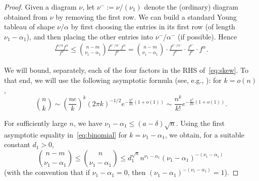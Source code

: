 \documentclass[12pt]%
{amsart}
\newcommand{\al}{{\alpha}}
\theoremstyle{plain}
\theoremstyle{definition}
\theoremstyle{remark}
\newcommand{\todo}[1]{\vspace{5 mm}\par \noindent
	\marginpar{\textsc{ToDo}} \framebox{\begin{minipage}[c]{0.95
				\textwidth}
			#1 \end{minipage}}\vspace{5 mm}\par}
\begin{document}
\begin{proof}
Given a diagram $\nu$, let $\nu^-:=\nu/(\nu_1)$ denote the (ordinary) diagram obtained from $\nu$ by removing the first row.
We can build a standard Young tableau of shape $\nu/\al$ by first choosing the entries in its first row (of length $\nu_1 - \al_1$), and then placing the other entries into  
$\nu^-/\al^-$ (if possible). Hence
\begin{eqnarray}\label{eq:skew}
   \frac{f^{\nu/\al} f^\al}{f^\nu}
   \le \binom{n-m}{\nu_1-\al_1} \frac{f^{\nu^-/\al^-} f^\al}{f^\nu}
   = \binom{n-m}{\nu_1-\al_1} \cdot \frac{f^{\nu^-/\al^-}}{f^{\nu^-}} \cdot \frac{f^{\nu^-}}{f^\nu} \cdot f^\al. 
\end{eqnarray}

We will bound, separately, each of the four factors in the RHS of~\eqref{eq:skew}.
To that end, we will use the following asymptotic formula (see, e.g., 
\cite[(5.12)]{Spencer}): for $k=o(n)$,
\begin{equation}\label{eq:binomial}
    \binom{n}{k}
    \sim \left( \frac{ne}{k} \right)^k (2\pi k)^{-1/2} e^{-\frac{k^2}{2n}(1+o(1))}
    \sim \frac{n^k}{k!} e^{-\frac{k^2}{2n}(1+o(1))}.
\end{equation}

For sufficiently large $n$, we have $\nu_1-\al_1 \le (a-\delta) \sqrt n$. 
Using the first asymptotic equality in~\eqref{eq:binomial} for $k = \nu_1 - \al_1$,
we obtain, for a suitable constant $d_1 > 0$,
\begin{equation}\label{eq:factor1}
   \binom{n-m}{\nu_1-\al_1}
   \le \binom{n}{\nu_1-\al_1}
   \le d_1^{\sqrt n}n^{\nu_1-\al_1}(\nu_1-\al_1)^{-(\nu_1-\al_1)}\, 
\end{equation}
(with the convention that if $\nu_1-\al_1=0$, then $(\nu_1-\al_1)^{-(\nu_1-\al_1)}=1$).


\end{proof}
\end{document}
